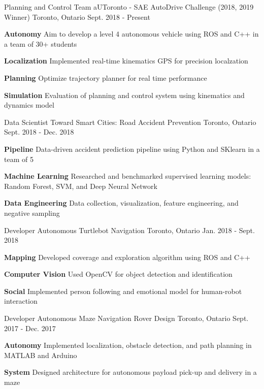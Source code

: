 \begin{cventries}
	\cventry
	{Planning and Control Team}
	{aUToronto - SAE AutoDrive Challenge (2018, 2019 Winner)}
	{Toronto, Ontario}
	{Sept. 2018 - Present}
	{
		\begin{cvitems}
			\item {\textbf{Autonomy} Aim to develop a level 4 autonomous vehicle using ROS and C++ in a team of 30+ students}
			\item {\textbf{Localization} Implemented real-time kinematics GPS for precision localzation
			}
			\item {\textbf{Planning} Optimize trajectory planner for real time performance		
			}
			\item {\textbf{Simulation} Evaluation of planning and control system using kinematics and dynamics model
			}
		\end{cvitems}
	}	
	\cventry
	{Data Scientist}
	{Toward Smart Cities: Road Accident Prevention}
	{Toronto, Ontario}
	{Sept. 2018 - Dec. 2018}
	{
		\begin{cvitems}
			\item {\textbf{Pipeline} Data-driven accident prediction pipeline using Python and SKlearn in a team of 5}
			\item {\textbf{Machine Learning} Researched and benchmarked supervised learning models: Random Forest, SVM, and Deep Neural Network}
			\item {\textbf{Data Engineering} Data collection, visualization, feature engineering, and negative sampling }
		\end{cvitems}
	}
	\cventry
	{Developer}
	{Autonomous Turtlebot Navigation}
	{Toronto, Ontario}
	{Jan. 2018 - Sept. 2018}
	{
		\begin{cvitems}
			\item {\textbf{Mapping} Developed coverage and exploration algorithm using ROS and C++}
			\item {\textbf{Computer Vision} Used OpenCV for object detection and identification}
			\item {\textbf{Social} Implemented person following and emotional model for human-robot interaction}
		\end{cvitems}
	}
	\cventry
	{Developer}
	{Autonomous Maze Navigation Rover Design}
	{Toronto, Ontario}
	{Sept. 2017 - Dec. 2017}
	{
		\begin{cvitems}
			\item { \textbf{Autonomy} Implemented localization, obstacle detection, and path planning in MATLAB and Arduino}
			\item { \textbf{System} Designed architecture for autonomous payload pick-up and delivery in a maze}
		\end{cvitems}
	}
\end{cventries}

